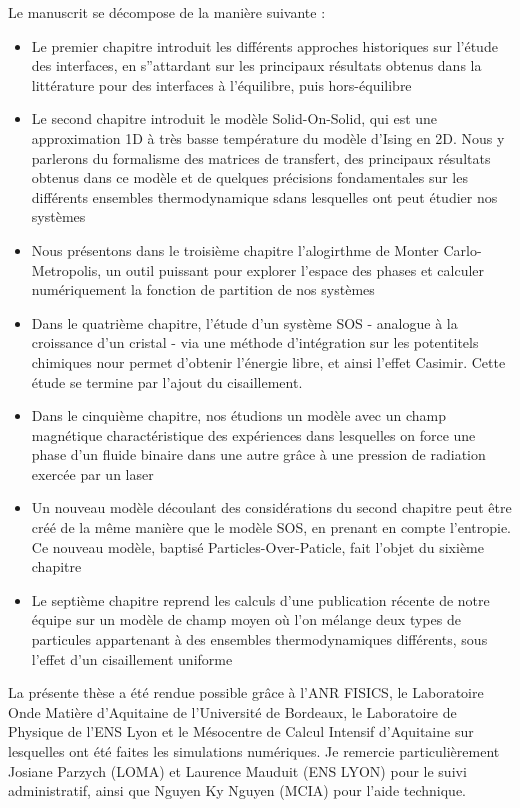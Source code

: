 Le manuscrit se décompose de la manière suivante :
\begin{itemize}
    \item Le premier chapitre introduit les différents approches historiques sur l'étude des interfaces, en s''attardant sur les principaux résultats obtenus dans la littérature pour des interfaces à l'équilibre, puis hors-équilibre
    \item Le second chapitre introduit le modèle Solid-On-Solid, qui est une approximation 1D à très basse température du modèle d'Ising en 2D. Nous y parlerons du formalisme des matrices de transfert, des principaux résultats obtenus dans ce modèle et de quelques précisions fondamentales sur les différents ensembles thermodynamique sdans lesquelles ont peut étudier nos systèmes
    \item Nous présentons dans le troisième chapitre l'alogirthme de Monter Carlo-Metropolis, un outil puissant pour explorer l'espace des phases et calculer numériquement la fonction de partition de nos systèmes
    \item Dans le quatrième chapitre, l'étude d'un système SOS - analogue à la croissance d'un cristal -  via une méthode d'intégration sur les potentitels chimiques nour permet d'obtenir l'énergie libre, et ainsi l'effet Casimir. Cette étude se termine par l'ajout du cisaillement.
        \item Dans le cinquième chapitre, nos étudions un modèle avec un champ magnétique charactéristique des expériences dans lesquelles on force une phase d'un fluide binaire dans une autre grâce à une pression de radiation exercée par un laser
    \item Un nouveau modèle découlant des considérations du second chapitre peut être créé de la même manière que le modèle SOS, en prenant en compte l'entropie. Ce nouveau modèle, baptisé Particles-Over-Paticle, fait l'objet du sixième chapitre
    \item Le septième chapitre reprend les calculs d'une publication récente de notre équipe sur un modèle de champ moyen où l'on mélange deux types de particules appartenant à des ensembles thermodynamiques différents, sous l'effet d'un cisaillement uniforme
\end{itemize}

La présente thèse a été rendue possible grâce à l'ANR FISICS, le Laboratoire Onde Matière d'Aquitaine de l'Université de Bordeaux, le Laboratoire de Physique de l'ENS Lyon et le Mésocentre de Calcul Intensif d'Aquitaine sur lesquelles ont été faites les simulations numériques. Je remercie particulièrement Josiane Parzych (LOMA) et Laurence Mauduit (ENS LYON) pour le suivi administratif, ainsi que Nguyen Ky Nguyen (MCIA) pour l'aide technique.
